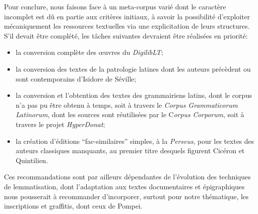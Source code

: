 Pour conclure, nous faisons face à un meta-corpus varié dont le caractère incomplet est dû en partie aux critères initiaux, à savoir la possibilité d'exploiter mécaniquement les ressources textuelles via une explicitation de leurs structures. S'il devait être complété, les tâches suivantes devraient être réalisées en priorité:
\begin{itemize}
    \item la conversion complète des œuvres du \textit{DigilibLT};
    \item la conversion des textes de la patrologie latines dont les auteurs précèdent ou sont contemporains d'Isidore de Séville;
    \item la conversion et l'obtention des textes des grammairiens latins, dont le corpus n'a pas pu être obtenu à temps, soit à travers le \textit{Corpus Grammaticorum Latinorum}, dont les sources sont réutilisées par le C\textit{orpus Corporum}, soit à travers le projet \textit{HyperDonat};
    \item la création d'éditions \enquote{fac-similaires} simples, à la \textit{Perseus}, pour les textes des auteurs classiques manquants, au premier titre desquels figurent Cicéron et Quintilien.
\end{itemize}
Ces recommandations sont par ailleurs dépendantes de l'évolution des techniques de lemmatisation, dont l'adaptation aux textes documentaires et épigraphiques nous pousserait à recommander d'incorporer, surtout pour notre thématique, les inscriptions et graffitis, dont ceux de Pompei.


